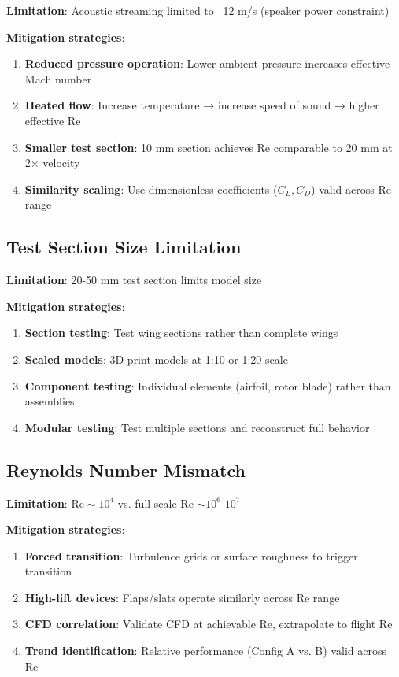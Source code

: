 \documentclass[12pt,a4paper]{article}
\begin{document}
\textbf{Limitation}: Acoustic streaming limited to ~12 m/s (speaker power constraint)

\textbf{Mitigation strategies}:
\begin{enumerate}
\item \textbf{Reduced pressure operation}: Lower ambient pressure increases effective Mach number
\item \textbf{Heated flow}: Increase temperature → increase speed of sound → higher effective Re
\item \textbf{Smaller test section}: 10 mm section achieves Re comparable to 20 mm at 2× velocity
\item \textbf{Similarity scaling}: Use dimensionless coefficients ($C_L, C_D$) valid across Re range
\end{enumerate}

\subsection{Test Section Size Limitation}

\textbf{Limitation}: 20-50 mm test section limits model size

\textbf{Mitigation strategies}:
\begin{enumerate}
\item \textbf{Section testing}: Test wing sections rather than complete wings
\item \textbf{Scaled models}: 3D print models at 1:10 or 1:20 scale
\item \textbf{Component testing}: Individual elements (airfoil, rotor blade) rather than assemblies
\item \textbf{Modular testing}: Test multiple sections and reconstruct full behavior
\end{enumerate}

\subsection{Reynolds Number Mismatch}

\textbf{Limitation}: $\text{Re} \sim 10^4$ vs. full-scale Re $\sim 10^6$-$10^7$

\textbf{Mitigation strategies}:
\begin{enumerate}
\item \textbf{Forced transition}: Turbulence grids or surface roughness to trigger transition
\item \textbf{High-lift devices}: Flaps/slats operate similarly across Re range
\item \textbf{CFD correlation}: Validate CFD at achievable Re, extrapolate to flight Re
\item \textbf{Trend identification}: Relative performance (Config A vs. B) valid across Re
\end{enumerate}
\end{document}
